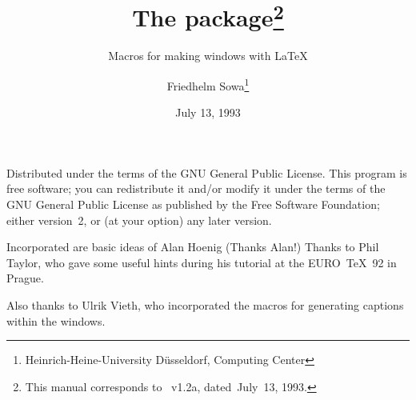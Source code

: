\documentclass[pagesize=auto, fontsize=14pt, DIV=12, parskip=half]{scrartcl}
\title{The \pkg{picinpar} package\thanks{This manual corresponds to \pkg{picinpar.sty}~v1.2a, dated~July~13, 1993.}}
\subtitle{Macros for making windows with \LaTeX}
\author{Friedhelm Sowa\thanks{Heinrich-Heine-University D\"usseldorf, Computing Center\newline\mail{sowa@uni-duesseldorf.de}}}
\date{July 13, 1993}
\makeatletter
\newcommand*{\pkg}[1]{\textsf{#1}}
\newcommand*{\cs}[1]{\texttt{\textbackslash#1}}
\newcommand*{\cmd}[1]{\cs{\expandafter\@gobble\string#1}}
\newcommand*{\env}[1]{\texttt{#1}}
\makeatother
\begin{document}
\maketitle

Distributed under the terms of the GNU General Public License.
This program is free software; you can redistribute it and/or
modify it under the terms of the GNU General Public License as
published by the Free Software Foundation; either version~2, or (at your
option) any later version.

Incorporated are basic ideas of Alan Hoenig (Thanks Alan!)
Thanks to Phil Taylor, who gave some useful hints during his
tutorial at the EURO~\TeX~92 in Prague.

Also thanks to Ulrik Vieth, who incorporated the macros for
generating captions within the windows.





\end{document}
